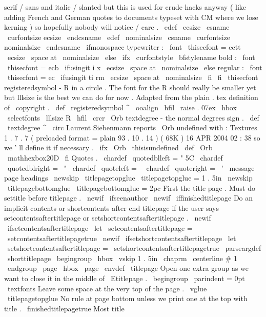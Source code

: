 {{{{serif
/
sans
and
italic
/
slanted
but
this
%
is
used
for
crude
hacks
anyway
(
like
adding
French
and
German
%
quotes
to
documents
typeset
with
CM
where
we
lose
kerning
)
so
%
hopefully
nobody
will
notice
/
care
.
\
edef
\
ecsize
{
\
csname
\
curfontsize
ecsize
\
endcsname
}
%
\
edef
\
nominalsize
{
\
csname
\
curfontsize
nominalsize
\
endcsname
}
%
\
ifmonospace
%
typewriter
:
\
font
\
thisecfont
=
ectt
\
ecsize
\
space
at
\
nominalsize
\
else
\
ifx
\
curfontstyle
\
bfstylename
%
bold
:
\
font
\
thisecfont
=
ecb
\
ifusingit
{
i
}
{
x
}
\
ecsize
\
space
at
\
nominalsize
\
else
%
regular
:
\
font
\
thisecfont
=
ec
\
ifusingit
{
ti
}
{
rm
}
\
ecsize
\
space
at
\
nominalsize
\
fi
\
fi
\
thisecfont
}
%
registeredsymbol
-
R
in
a
circle
.
The
font
for
the
R
should
really
%
be
smaller
yet
but
lllsize
is
the
best
we
can
do
for
now
.
%
Adapted
from
the
plain
.
tex
definition
of
\
copyright
.
%
\
def
\
registeredsymbol
{
%
^
{
{
\
ooalign
{
\
hfil
\
raise
.
07ex
\
hbox
{
\
selectfonts
\
lllsize
R
}
%
\
hfil
\
crcr
\
Orb
}
}
%
}
%
}
%
textdegree
-
the
normal
degrees
sign
.
%
\
def
\
textdegree
{
^
\
circ
}
%
Laurent
Siebenmann
reports
\
Orb
undefined
with
:
%
Textures
1
.
7
.
7
(
preloaded
format
=
plain
93
.
10
.
14
)
(
68K
)
16
APR
2004
02
:
38
%
so
we
'
ll
define
it
if
necessary
.
%
\
ifx
\
Orb
\
thisisundefined
\
def
\
Orb
{
\
mathhexbox20D
}
\
fi
%
Quotes
.
\
chardef
\
quotedblleft
=
"
5C
\
chardef
\
quotedblright
=
\
"
\
chardef
\
quoteleft
=
\
\
chardef
\
quoteright
=
\
'
\
message
{
page
headings
}
\
newskip
\
titlepagetopglue
\
titlepagetopglue
=
1
.
5in
\
newskip
\
titlepagebottomglue
\
titlepagebottomglue
=
2pc
%
First
the
title
page
.
Must
do
settitle
before
titlepage
.
\
newif
\
ifseenauthor
\
newif
\
iffinishedtitlepage
%
Do
an
implicit
contents
or
shortcontents
after
end
titlepage
if
the
%
user
says
setcontentsaftertitlepage
or
setshortcontentsaftertitlepage
.
%
\
newif
\
ifsetcontentsaftertitlepage
\
let
\
setcontentsaftertitlepage
=
\
setcontentsaftertitlepagetrue
\
newif
\
ifsetshortcontentsaftertitlepage
\
let
\
setshortcontentsaftertitlepage
=
\
setshortcontentsaftertitlepagetrue
\
parseargdef
\
shorttitlepage
{
%
\
begingroup
\
hbox
{
}
\
vskip
1
.
5in
\
chaprm
\
centerline
{
#
1
}
%
\
endgroup
\
page
\
hbox
{
}
\
page
}
\
envdef
\
titlepage
{
%
%
Open
one
extra
group
as
we
want
to
close
it
in
the
middle
of
\
Etitlepage
.
\
begingroup
\
parindent
=
0pt
\
textfonts
%
Leave
some
space
at
the
very
top
of
the
page
.
\
vglue
\
titlepagetopglue
%
No
rule
at
page
bottom
unless
we
print
one
at
the
top
with
title
.
\
finishedtitlepagetrue
%
%
Most
title
}}}}
